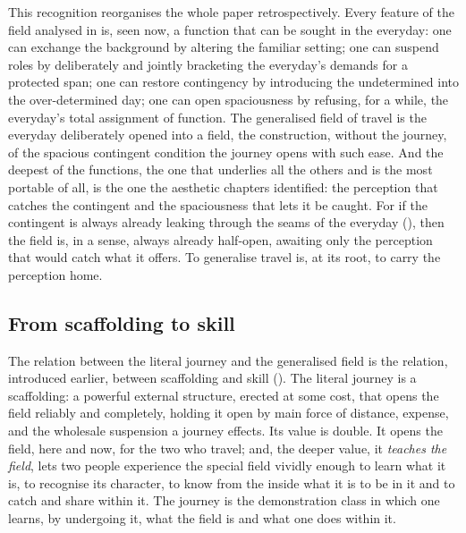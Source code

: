 This recognition reorganises the whole paper retrospectively. Every feature of the field analysed in  is, seen now, a function that can be sought in the everyday: one can exchange the background by altering the familiar setting; one can suspend roles by deliberately and jointly bracketing the everyday's demands for a protected span; one can restore contingency by introducing the undetermined into the over-determined day; one can open spaciousness by refusing, for a while, the everyday's total assignment of function. The generalised field of travel is the everyday deliberately opened into a field, the construction, without the journey, of the spacious contingent condition the journey opens with such ease. And the deepest of the functions, the one that underlies all the others and is the most portable of all, is the one the aesthetic chapters identified: the perception that catches the contingent and the spaciousness that lets it be caught. For if the contingent is always already leaking through the seams of the everyday (), then the field is, in a sense, always already half-open, awaiting only the perception that would catch what it offers. To generalise travel is, at its root, to carry the perception home.

\subsection{From scaffolding to skill}
\label{p21:sub:gen-scaffolding}

The relation between the literal journey and the generalised field is the relation, introduced earlier, between scaffolding and skill (). The literal journey is a scaffolding: a powerful external structure, erected at some cost, that opens the field reliably and completely, holding it open by main force of distance, expense, and the wholesale suspension a journey effects. Its value is double. It opens the field, here and now, for the two who travel; and, the deeper value, it \emph{teaches the field}, lets two people experience the special field vividly enough to learn what it is, to recognise its character, to know from the inside what it is to be in it and to catch and share within it. The journey is the demonstration class in which one learns, by undergoing it, what the field is and what one does within it.

